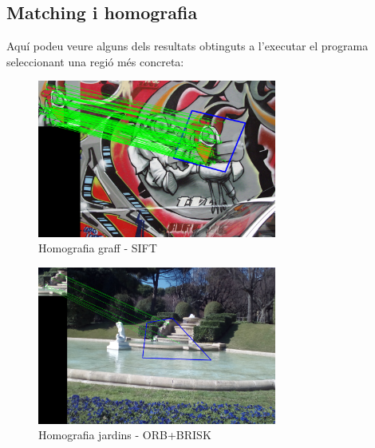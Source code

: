 \newpage
	\subsection{Matching i homografia}
		Aquí podeu veure alguns dels resultats obtinguts a l'executar el programa seleccionant una regió més concreta:
		\begin{figure}[H]
			\centering
			\includegraphics[width=0.7\textwidth]{images/homography}
			\caption{Homografia graff - SIFT}
		\end{figure}
		\begin{figure}[H]
			\centering
			\includegraphics[width=0.7\textwidth]{images/jardiSel}
			\caption{Homografia jardins - ORB+BRISK}
		\end{figure}

\newpage


